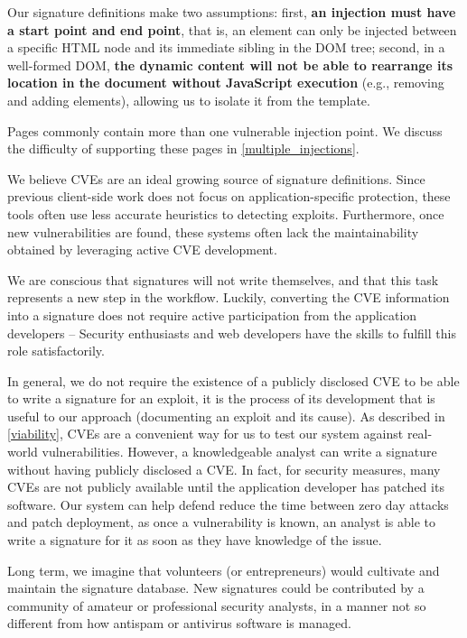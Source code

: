 Our signature definitions make two assumptions: first,
\textbf{an injection must have a start point and end point}, that is,
an element can only be injected between a specific HTML node and its
immediate sibling in the DOM tree; second, in a well-formed DOM,
\textbf{the dynamic content will not be able to rearrange its location
  in the document without JavaScript execution} (e.g., removing and
adding elements), allowing us to isolate it from the template.

Pages commonly contain more than one vulnerable injection point.
We discuss the difficulty of supporting these pages in \autoref{multiple_injections}.

We believe CVEs are an ideal growing source of signature
definitions. Since previous client-side work does not focus on
application-specific protection, these tools often use less accurate
heuristics to detecting exploits. Furthermore, once new
vulnerabilities are found, these systems often lack the
maintainability obtained by leveraging active CVE development.

We are conscious that \sys signatures will not write themselves, and that
this task represents a new step in the workflow. Luckily, converting
the CVE information into a signature does not require active
participation from the application developers -- Security enthusiasts and
web developers have the skills to fulfill this role satisfactorily.

In general, we do not require the existence of a publicly disclosed CVE to be able to write a signature for an exploit, it is the process of its development that is useful to our approach (documenting an exploit and its cause). As described in \autoref{viability}, CVEs are a convenient way for us to test our system against real-world vulnerabilities. However, a knowledgeable analyst can write a signature without having publicly disclosed a CVE. In fact, for security measures, many CVEs are not publicly available until the application developer has patched its software. Our system can help defend reduce the time between zero day attacks and patch deployment, as once a vulnerability is known, an analyst is able to write a signature for it as soon as they have knowledge of the issue.

Long term, we imagine that volunteers (or entrepreneurs) would
cultivate and maintain the signature database. New signatures could be
contributed by a community of amateur or professional security analysts, in a manner not
so different from how antispam or antivirus software is managed.

